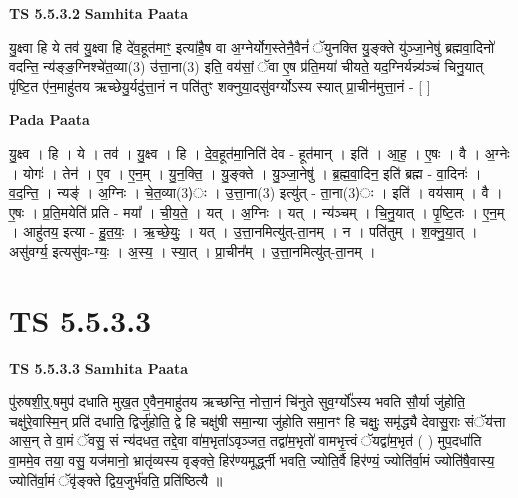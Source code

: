 \documentclass[17pt]{extarticle}
\begin{document}
\textbf{TS 5.5.3.2 } \newline
\textbf{Samhita Paata} \newline

यु॒क्ष्वा हि ये तव॑ यु॒क्ष्वा हि दे॑व॒हूत॑माꣳ॒॒ इत्या॑है॒ष वा अ॒ग्नेर्योग॒स्तेनै॒वैनं॑ ॅयुनक्ति यु॒ङ्क्ते यु॑ञ्जा॒नेषु॑ ब्रह्मवा॒दिनो॑ वदन्ति॒ न्य॑ङ्ङ॒ग्निश्चे॑त॒व्या(3) उ॑त्ता॒ना(3) इति॒ वय॑सां॒ ॅवा ए॒ष प्र॑ति॒मया॑ चीयते॒ यद॒ग्निर्यन्न्य॑ञ्चं चिनु॒यात् पृ॑ष्टि॒त ए॑न॒माहु॑तय ऋच्छेयु॒र्यदु॑त्ता॒नं न पति॑तुꣳ शक्नुया॒दसु॑वर्ग्योऽस्य स्यात् प्रा॒चीन॑मुत्ता॒नं - [  ] \newline

\textbf{Pada Paata} \newline

यु॒क्ष्व । हि । ये । तव॑ । यु॒क्ष्व । हि । दे॒व॒हूत॑मा॒निति॑ देव - हूत॑मान् । इति॑ । आ॒ह॒ । ए॒षः । वै । अ॒ग्नेः । योगः॑ । तेन॑ । ए॒व । ए॒न॒म् । यु॒न॒क्ति॒ । यु॒ङ्क्ते । यु॒ञ्जा॒नेषु॑ । ब्र॒ह्म॒वा॒दिन॒ इति॑ ब्रह्म - वा॒दिनः॑ । व॒द॒न्ति॒ । न्यङ्॑ । अ॒ग्निः । चे॒त॒व्या(3)ः । उ॒त्ता॒ना(3) इत्यु॑त् - ता॒ना(3)ः । इति॑ । वय॑साम् । वै । ए॒षः । प्र॒ति॒मयेति॑ प्रति - मया᳚ । ची॒य॒ते॒ । यत् । अ॒ग्निः । यत् । न्य॑ञ्चम् । चि॒नु॒यात् । पृ॒ष्टि॒तः । ए॒न॒म् । आहु॑तय॒ इत्या - हु॒त॒यः॒ । ऋ॒च्छे॒युः॒ । यत् । उ॒त्ता॒नमित्यु॑त्-ता॒नम् । न । पति॑तुम् । श॒क्नु॒या॒त् । असु॑वर्ग्य॒ इत्यसु॑वः-ग्यः॒ । अ॒स्य॒ । स्या॒त् । प्रा॒चीन᳚म् । उ॒त्ता॒नमित्यु॑त्-ता॒नम् ।  \newline




\section*{ TS 5.5.3.3 }

\textbf{TS 5.5.3.3 } \newline
\textbf{Samhita Paata} \newline

पु॑रुषशी॒र्॒.षमुप॑ दधाति मुख॒त ए॒वैन॒माहु॑तय ऋच्छन्ति॒ नोत्ता॒नं चि॑नुते सुव॒र्ग्यो᳚ऽस्य भवति सौ॒र्या जु॑होति॒ चक्षु॑रे॒वास्मि॒न् प्रति॑ दधाति॒ द्विर्जु॑होति॒ द्वे हि चक्षु॑षी समा॒न्या जु॑होति समा॒नꣳ हि चक्षुः॒ समृ॑द्ध्यै देवासु॒राः संॅय॑त्ता आस॒न् ते वा॒मं ॅवसु॒ सं न्य॑दधत॒ तद्दे॒वा वा॑म॒भृता॑ऽवृञ्जत॒ तद्वा॑म॒भृतो॑ वामभृ॒त्त्वं ॅयद्वा॑म॒भृत॑ ( ) मुप॒दधा॑ति वा॒ममे॒व तया॒ वसु॒ यज॑मानो॒ भ्रातृ॑व्यस्य वृङ्क्ते॒ हिर॑ण्यमूर्द्ध्नी भवति॒ ज्योति॒र्वै हिर॑ण्यं॒ ज्योति॑र्वा॒मं ज्योति॑षै॒वास्य॒ ज्योति॑र्वा॒मं ॅवृ॑ङ्क्ते द्विय॒जुर्भ॑वति॒ प्रति॑ष्ठित्यै ॥ \newline
\end{document}
